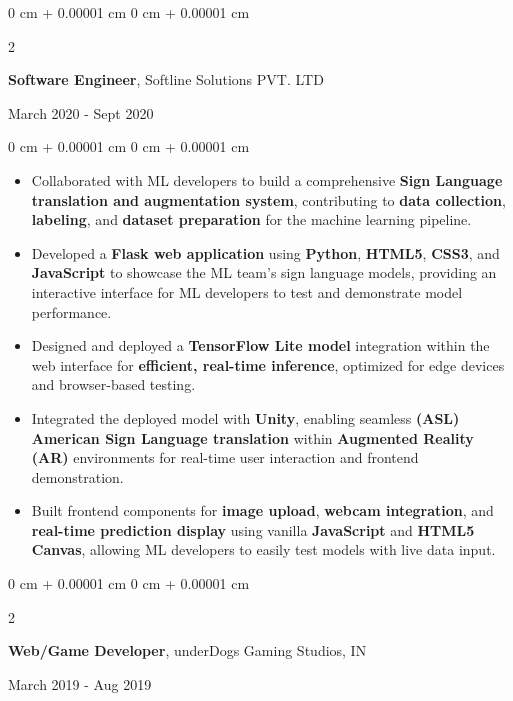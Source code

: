 \documentclass[10pt, letterpaper]{article}
\newenvironment{highlights}{
    \begin{itemize}[
        topsep=0.10 cm,
        parsep=0.10 cm,
        partopsep=0pt,
        itemsep=0pt,
        leftmargin=0 cm + 10pt
    ]
}{
    \end{itemize}
} %
\newenvironment{onecolentry}{
    \begin{adjustwidth}{
        0 cm + 0.00001 cm
    }{
        0 cm + 0.00001 cm
    }
}{
    \end{adjustwidth}
} %
\newenvironment{twocolentry}[2][]{
    \onecolentry
    \def\secondColumn{#2}
    \setcolumnwidth{\fill, 4.5 cm}
    \begin{paracol}{2}
}{
    \switchcolumn \raggedleft \secondColumn
    \end{paracol}
    \endonecolentry
} %
\begin{document}
\vspace{0.15 cm}
\begin{twocolentry}{
		March 2020 - Sept 2020
	}
	\textbf{Software Engineer}, Softline Solutions PVT. LTD
\end{twocolentry}
\begin{onecolentry}
	\begin{highlights}
		\item Collaborated with ML developers to build a comprehensive \textbf{Sign Language translation and augmentation system}, contributing to \textbf{data collection}, \textbf{labeling}, and \textbf{dataset preparation} for the machine learning pipeline.
		\item Developed a \textbf{Flask web application} using \textbf{Python}, \textbf{HTML5}, \textbf{CSS3}, and \textbf{JavaScript} to showcase the ML team's sign language models, providing an interactive interface for ML developers to test and demonstrate model performance.
		\item Designed and deployed a \textbf{TensorFlow Lite model} integration within the web interface for \textbf{efficient, real-time inference}, optimized for edge devices and browser-based testing.
		\item Integrated the deployed model with \textbf{Unity}, enabling seamless \textbf{(ASL) American Sign Language translation} within \textbf{Augmented Reality (AR)} environments for real-time user interaction and frontend demonstration.
		\item Built frontend components for \textbf{image upload}, \textbf{webcam integration}, and \textbf{real-time prediction display} using vanilla \textbf{JavaScript} and \textbf{HTML5 Canvas}, allowing ML developers to easily test models with live data input.
	\end{highlights}
\end{onecolentry}




\vspace{0.15 cm}
\begin{twocolentry}{
		March 2019 - Aug 2019
	}
	\textbf{Web/Game Developer}, underDogs Gaming Studios, IN
\end{twocolentry}
\end{document}
